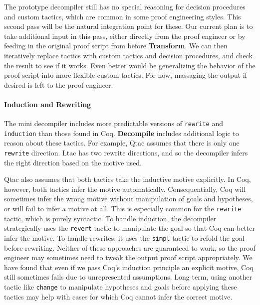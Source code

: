 The prototype decompiler still has no special reasoning for decision procedures and custom tactics, which are common
in some proof engineering styles.
This second pass will be the natural integration point for these.
Our current plan is to take additional input in this pass, either directly from the proof engineer
or by feeding in the original proof script from before \textbf{Transform}.
We can then iteratively replace tactics with custom tactics and decision procedures, and check the result to see if it works.
Even better would be generalizing the behavior of the proof script into more flexible custom tactics.
For now, massaging the output if desired is left to the proof engineer. %

\paragraph{Induction and Rewriting}
The mini decompiler includes more predictable versions of \lstinline{rewrite} and \lstinline{induction}
than those found in Coq. \textbf{Decompile} includes additional logic to reason about these tactics.
For example, Qtac assumes that there is only one \lstinline{rewrite} direction. Ltac has two rewrite directions,
and so the decompiler infers the right direction based on the motive used.

Qtac also assumes that both tactics take the inductive motive explicitly.
In Coq, however, both tactics infer the motive automatically.
Consequentially, Coq will sometimes infer the wrong motive without manipulation of goals and hypotheses,
or will fail to infer a motive at all.
This is especially common for the \lstinline{rewrite} tactic, which is purely syntactic.
To handle induction, the decompiler strategically uses the \lstinline{revert} tactic to manipulate the goal
so that Coq can better infer the motive.
To handle rewrites, it uses the \lstinline{simpl} tactic to refold the goal before rewriting.
Neither of these approaches are guaranteed to work, so the proof engineer may sometimes need to tweak the output proof script appropriately.
We have found that even if we pass Coq's induction principle an explicit motive, Coq still sometimes fails due
to unrepresented assumptions.
Long term, using another tactic like \lstinline{change} to manipulate hypotheses and goals before applying these tactics
may help with cases for which Coq cannot infer the correct motive.

